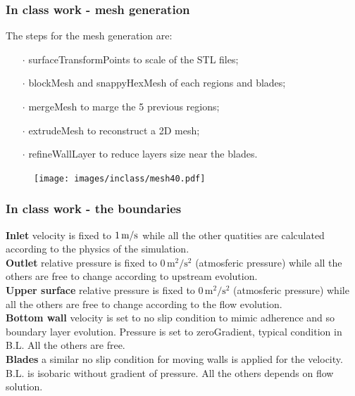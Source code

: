 \documentclass{beamer}
\newcommand{\foam}[1]{{\ttfamily #1}}
\begin{document}
\begin{frame}
\frametitle{In class work - mesh generation}
The steps for the mesh generation are:
\begin{itemize}
\item[$\cdot$] \foam{surfaceTransformPoints} to scale of the STL files;
\item[$\cdot$] \foam{blockMesh} and \foam{snappyHexMesh} of each regions and blades;
\item[$\cdot$] \foam{mergeMesh} to marge the 5 previous regions;
\item[$\cdot$] \foam{extrudeMesh} to reconstruct a 2D mesh;
\item[$\cdot$] \foam{refineWallLayer} to reduce layers size near the blades.
\end{itemize}

\begin{figure}[H]
\centering
\texttt{[image: images/inclass/mesh40.pdf]}
\end{figure}

\end{frame}

\begin{frame}
\frametitle{In class work - the boundaries}

\textbf{Inlet} \quad velocity is fixed to $1\,\text{m}/\text{s}$ while all the other quatities are calculated according to the physics of the simulation.
\\
\textbf{Outlet} \quad relative pressure is fixed to $0 \,\text{m}^2/\text{s}^2$ (atmosferic pressure) while all the others are free to change according to upstream evolution.
\\
\textbf{Upper surface} \quad relative pressure is fixed to $0 \,\text{m}^2/\text{s}^2$ (atmosferic pressure) while all the others are free to change according to the flow evolution.
\\
\textbf{Bottom wall} \quad velocity is set to no slip condition to mimic adherence and so boundary layer evolution. Pressure is set to \foam{zeroGradient}, typical condition in B.L. All the others are free.
\\\textbf{Blades} \quad a similar no slip condition for moving walls is applied for the velocity. B.L. is isobaric without gradient of pressure. All the others depends on flow solution.

\end{frame}
\end{document}
